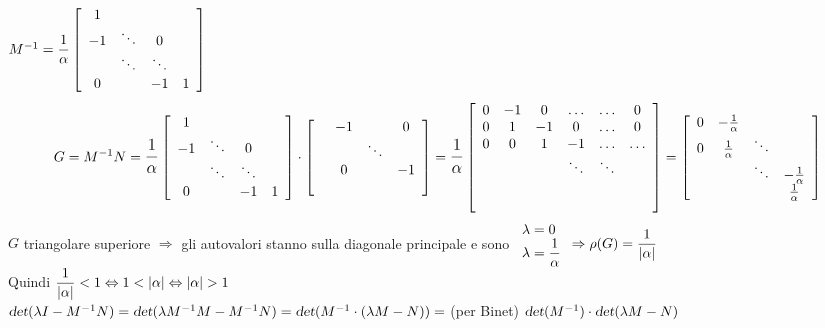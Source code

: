 \documentclass[10pt]{book}
\begin{document}
$M^{-1} = \mathlarger{\frac{1}{\alpha}}\left[\begin{array}{c c c c}
1 &  & & \\
-1 & \ddots &0 \\
 & \ddots & \ddots & \\
 0&  & -1 & 1
\end{array} \right]$
$$G = M^{-1}N = \mathlarger{\frac{1}{\alpha}}\left[\begin{array}{c c c c}
1 &  & & \\
-1 & \ddots &0 \\
 & \ddots & \ddots & \\
 0&  & -1 & 1
\end{array} \right]\cdot\left[\begin{array}{c c c c}
& -1 & & 0\\
& & \ddots\\
& 0 & & -1\\
& &  & 
\end{array} \right]
= \mathlarger{\frac{1}{\alpha}}\left[\begin{array}{c c c c c c c}
0 & -1 & 0 & \ldots & \ldots & 0\\
0 & 1 & -1 & 0 & \ldots & 0\\
0 & 0 & 1 & -1 & \ldots & \ldots\\
& & & \ddots & \ddots\\
\\
\\
\end{array} \right] = \left[\begin{array}{c c c c}
0 & -\frac{1}{\alpha} \\
0 & \frac{1}{\alpha} & \ddots\\
& & \ddots & -\frac{1}{\alpha}\\
& & & \frac{1}{\alpha}
\end{array} \right]$$
$G$ triangolare superiore $\Rightarrow$ gli autovalori stanno sulla diagonale principale e sono $\begin{array}{l}
\lambda = 0\\
\lambda = \mathlarger{\frac{1}{\alpha}}
\end{array} \Rightarrow \rho(G) = \mathlarger{\frac{1}{|\alpha|}}$\\
Quindi $\mathlarger{\frac{1}{|\alpha|}} < 1 \Leftrightarrow 1 < |\alpha| \Leftrightarrow |\alpha| > 1$\\
$\textsl{det}(\lambda I - M^{-1}N) = \textsl{det}(\lambda M^{-1}M - M^{-1}N) = \textsl{det}(M^{-1}\cdot(\lambda M - N)) =$ (per Binet) $\textsl{det}(M^{-1})\cdot\textsl{det}(\lambda M - N)$\\
\end{document}
